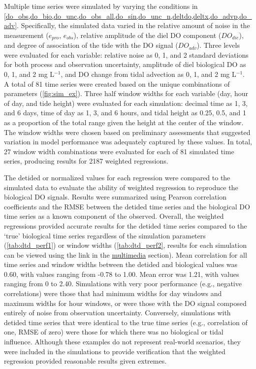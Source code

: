 \documentclass[letterpaper,12pt,oneside]{article}\usepackage[]{graphicx}\usepackage[]{color}
\begin{document}
Multiple time series were simulated by varying the conditions in \cref{do_obs,do_bio,do_unc,do_obs_all,do_sin,do_unc_n,deltdo,deltx,do_advp,do_adv}. Specifically, the simulated data varied in the relative amount of noise in the measurement ($e_{pro}$, $e_{obs}$), relative amplitude of the diel \ac{DO} component ($DO_{die}$), and degree of association of the tide with the \ac{DO} signal ($DO_{adv}$).  Three levels were evaluated for each variable: relative noise as 0, 1, and 2 standard deviations for both process and observation uncertainty, amplitude of diel biological \ac{DO} as 0, 1, and 2 mg L$^{-1}$, and \ac{DO} change from tidal advection as 0, 1, and 2 mg L$^{-1}$. A total of 81 time series were created based on the unique combinations of parameters (\cref{fig:sim_ex}).  Three half window widths for each variable (day, hour of day, and tide height) were evaluated for each simulation: decimal time as 1, 3, and 6 days, time of day as 1, 3, and 6 hours, and tidal height as 0.25, 0.5, and 1 as a proportion of the total range given the height at the center of the window.  The window widths were chosen based on preliminary assessments that suggested variation in model performance was adequately captured by these values.  In total, 27 window width combinations were evaluated for each of 81 simulated time series, producing results for 2187 weighted regressions.

The detided or normalized values for each regression were compared to the simulated data to evaluate the ability of weighted regression to reproduce the biological \ac{DO} signals. Results were summarized using Pearson correlation coefficients and the \ac{RMSE} between the detided time series and the biological \ac{DO} time series as a known component of the observed.  Overall, the weighted regressions provided accurate results for the detided time series compared to the `true' biological time series regardless of the simulation parameters (\cref{tab:dtd_perf1}) or window widths (\cref{tab:dtd_perf2},   results for each simulation can be viewed using the link in the \hyperref[multi]{multimedia} section).  Mean correlation for all time series and window widths between the detided and biological values was 0.60, with values ranging from -0.78 to 1.00.  Mean error was 1.21, with values ranging from 0 to 2.40.  Simulations with very poor performance (e.g., negative correlations) were those that had minimum widths for day windows and maximum widths for hour windows, or were those with the \ac{DO} signal composed entirely of noise from observation uncertainty. Conversely, simulations with detided time series that were identical to the true time series (e.g., correlation of one, \ac{RMSE} of zero) were those for which there was no biological or tidal influence.  Although these examples do not represent real-world scenarios, they were included in the simulations to provide verification that the weighted regression provided reasonable results given extremes.  
\end{document}
